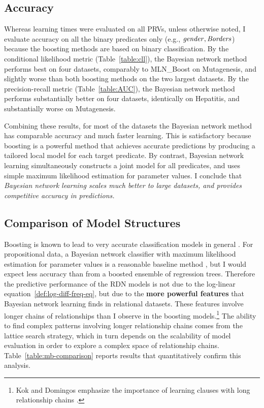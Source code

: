 \documentclass{sfuthesis}
\begin{document}
\subsection{Accuracy} Whereas learning times were evaluated on all PRVs, unless otherwise noted, I  evaluate accuracy on all the  binary predicates only (e.g., $\it{gender},\it{Borders}$) because the boosting methods are based on binary classification. By the conditional likelihood metric (Table~\ref{table:cll}), the Bayesian network method performs best on four datasets, comparably to MLN\_Boost on Mutagenesis, and slightly worse than both boosting methods on the two largest datasets. By the precision-recall metric (Table~\ref{table:AUC}), the Bayesian network method performs substantially better on four datasets, identically on Hepatitis, and substantially worse on Mutagenesis.

Combining these results, for most of the datasets the Bayesian network method has comparable accuracy and much faster learning. This is satisfactory because boosting is a powerful method that achieves accurate predictions by producing a tailored local model for each target predicate. By contrast, Bayesian network learning simultaneously constructs a joint model for all predicates, and uses simple maximum likelihood estimation for parameter values.
I  conclude that \emph{Bayesian network  learning scales much better to large datasets, and provides competitive accuracy in predictions.} 
 
\subsection{Comparison of Model Structures} 
Boosting is known to lead to very accurate classification models in general \cite{Bishop2006}. For propositional data, a Bayesian network classifier with maximum likelihood estimation for parameter values is a reasonable baseline method \cite{Grossman2004}, but I  would expect less accuracy than from a boosted ensemble of regression trees.
Therefore the predictive performance of the RDN models is not due to the log-linear equation~\eqref{def:log-diff-freq-eq}, but due to the \textbf{more powerful features} that Bayesian network learning finds in relational datasets. These features involve longer chains of relationships than I observe in the boosting models.\footnote{Kok and Domingos emphasize the importance of learning clauses with long relationship chains \cite{Kok2010}.} 
The ability to find complex patterns involving longer relationship chains comes from the lattice search strategy, which in turn depends on the scalability of model evaluation in order to explore a complex space of relationship chains. Table~\ref{table:mb-comparison} reports results that quantitatively confirm this analysis.
 
\end{document}
